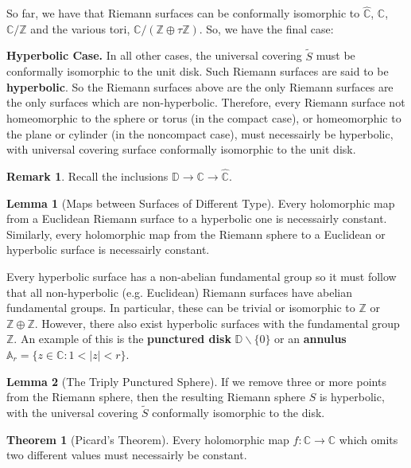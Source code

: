 \documentclass{article}
\theoremstyle{definition}
\newtheorem{theorem}{Theorem}
\newtheorem{lemma}{Lemma}
\newtheorem*{remark}{Remark}
\begin{document}
    So far, we have that Riemann surfaces can be conformally isomorphic to $\hat{\mathbb{C}}$, $\mathbb{C}$, $\mathbb{C}/\mathbb{Z}$
    and the various tori, $\mathbb{C}/(\mathbb{Z}\oplus\tau\mathbb{Z})$. So, we have the final case:

    \textbf{Hyperbolic Case.} In all other cases, the universal covering $\widetilde{S}$ must be conformally isomorphic to the unit
    disk. Such Riemann surfaces are said to be \textbf{hyperbolic}. So the Riemann surfaces above are the only Riemann surfaces
    are the only surfaces which are non-hyperbolic. Therefore, every Riemann surface not homeomorphic to the sphere or torus
    (in the compact case), or homeomorphic to the plane or cylinder (in the noncompact case), must necessairly be hyperbolic, with
    universal covering surface conformally isomorphic to the unit disk.

    \begin{remark} Recall the inclusions $\mathbb{D}\to\mathbb{C}\to\hat{\mathbb{C}}$.
    \end{remark}

    \begin{lemma}[Maps between Surfaces of Different Type]
        Every holomorphic map from a Euclidean Riemann surface to a hyperbolic one is necessairly constant. Similarly, every holomorphic
        map from the Riemann sphere to a Euclidean or hyperbolic surface is necessairly constant.
    \end{lemma}

    Every hyperbolic surface has a non-abelian fundamental group so it must follow that all non-hyperbolic (e.g. Euclidean) Riemann
    surfaces have abelian fundamental groups. In particular, these can be trivial or isomorphic to $\mathbb{Z}$ or 
    $\mathbb{Z}\oplus\mathbb{Z}$. However, there also exist hyperbolic surfaces with the fundamental group $\mathbb{Z}$. An example
    of this is the \textbf{punctured disk} $\mathbb{D}\backslash\{0\}$ or an \textbf{annulus} 
    $\mathbb{A}_r = \{z\in\mathbb{C}: 1<|z|<r\}$.

    \begin{lemma}[The Triply Punctured Sphere]
        If we remove three or more points from the Riemann sphere, then the resulting Riemann sphere $S$ is hyperbolic, with the
        universal covering $\widetilde{S}$ conformally isomorphic to the disk.
    \end{lemma}

    \begin{theorem}[Picard's Theorem]
        Every holomorphic map $f:\mathbb{C}\to\mathbb{C}$ which omits two different values must necessairly be constant.
    \end{theorem}
\end{document}
